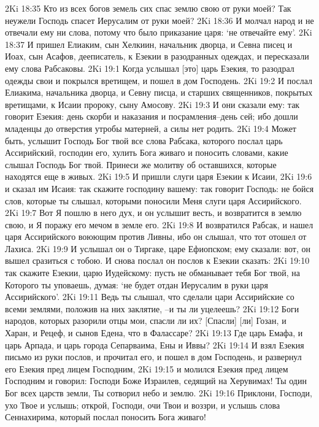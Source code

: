 2Ki 18:35  Кто из всех богов земель сих спас землю свою от руки моей? Так неужели Господь спасет Иерусалим от руки моей?
2Ki 18:36  И молчал народ и не отвечали ему ни слова, потому что было приказание царя: `не отвечайте ему'.
2Ki 18:37  И пришел Елиаким, сын Хелкиин, начальник дворца, и Севна писец и Иоах, сын Асафов, дееписатель, к Езекии в разодранных одеждах, и пересказали ему слова Рабсаковы.
2Ki 19:1  Когда услышал [это] царь Езекия, то разодрал одежды свои и покрылся вретищем, и пошел в дом Господень.
2Ki 19:2  И послал Елиакима, начальника дворца, и Севну писца, и старших священников, покрытых вретищами, к Исаии пророку, сыну Амосову.
2Ki 19:3  И они сказали ему: так говорит Езекия: день скорби и наказания и посрамления--день сей; ибо дошли младенцы до отверстия утробы матерней, а силы нет родить.
2Ki 19:4  Может быть, услышит Господь Бог твой все слова Рабсака, которого послал царь Ассирийский, господин его, хулить Бога живаго и поносить словами, какие слышал Господь Бог твой. Принеси же молитву об оставшихся, которые находятся еще в живых.
2Ki 19:5  И пришли слуги царя Езекии к Исаии,
2Ki 19:6  и сказал им Исаия: так скажите господину вашему: так говорит Господь: не бойся слов, которые ты слышал, которыми поносили Меня слуги царя Ассирийского.
2Ki 19:7  Вот Я пошлю в него дух, и он услышит весть, и возвратится в землю свою, и Я поражу его мечом в земле его.
2Ki 19:8  И возвратился Рабсак, и нашел царя Ассирийского воюющим против Ливны, ибо он слышал, что тот отошел от Лахиса.
2Ki 19:9  И услышал он о Тиргаке, царе Ефиопском; ему сказали: вот, он вышел сразиться с тобою. И снова послал он послов к Езекии сказать:
2Ki 19:10  так скажите Езекии, царю Иудейскому: пусть не обманывает тебя Бог твой, на Которого ты уповаешь, думая: `не будет отдан Иерусалим в руки царя Ассирийского'.
2Ki 19:11  Ведь ты слышал, что сделали цари Ассирийские со всеми землями, положив на них заклятие, --и ты ли уцелеешь?
2Ki 19:12  Боги народов, которых разорили отцы мои, спасли ли их? [Спасли] [ли] Гозан, и Харан, и Рецеф, и сынов Едена, что в Фалассаре?
2Ki 19:13  Где царь Емафа, и царь Арпада, и царь города Сепарваима, Ены и Иввы?
2Ki 19:14  И взял Езекия письмо из руки послов, и прочитал его, и пошел в дом Господень, и развернул его Езекия пред лицем Господним,
2Ki 19:15  и молился Езекия пред лицем Господним и говорил: Господи Боже Израилев, седящий на Херувимах! Ты один Бог всех царств земли, Ты сотворил небо и землю.
2Ki 19:16  Приклони, Господи, ухо Твое и услышь; открой, Господи, очи Твои и воззри, и услышь слова Сеннахирима, который послал поносить Бога живаго!
